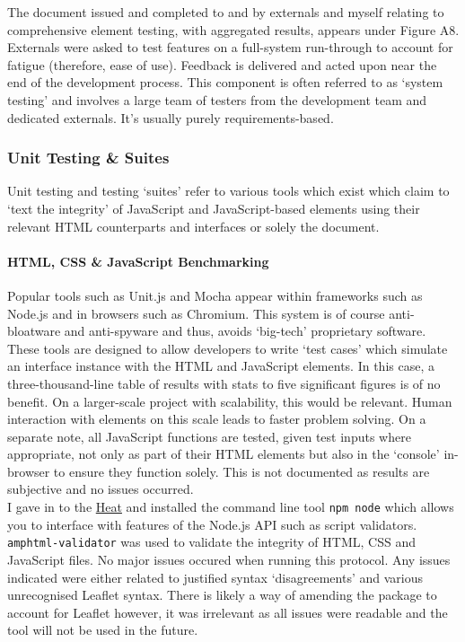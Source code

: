 \documentclass[11pt, english]{article}
\begin{document}
	The document issued and completed to and by externals and myself relating to comprehensive element testing, with aggregated results, appears under Figure A8. Externals were asked to test features on a full-system run-through to account for fatigue (therefore, ease of use). Feedback is delivered and acted upon near the end of the development process. This component is often referred to as `system testing' and involves a large team of testers from the development team and dedicated externals. It's usually purely requirements-based.

		\subsubsection{Unit Testing \& Suites}

	Unit testing and testing `suites' refer to various tools which exist which claim to `text the integrity' of JavaScript and JavaScript-based elements using their relevant HTML counterparts and interfaces or solely the document.

			\paragraph{HTML, CSS \& JavaScript Benchmarking}

 	Popular tools such as Unit.js and Mocha appear within frameworks such as Node.js and in browsers such as Chromium. This system is of course anti-bloatware and anti-spyware and thus, avoids `big-tech' proprietary software. These tools are designed to allow developers to write `test cases' which simulate an interface instance with the HTML and JavaScript elements. In this case, a three-thousand-line table of results with stats to five significant figures is of no benefit. On a larger-scale project with scalability, this would be relevant. Human interaction with elements on this scale leads to faster problem solving. On a separate note, all JavaScript functions are tested, given test inputs where appropriate, not only as part of their HTML elements but also in the `console' in-browser to ensure they function solely. This is not documented as results are subjective and no issues occurred.\\

	I gave in to the \href{https://www.youtube.com/watch?v=ZL9fnVtz_lc}{Heat} and installed the command line tool \texttt{npm node} which allows you to interface with features of the Node.js API such as script validators. \texttt{amphtml-validator} was used to validate the integrity of HTML, CSS and JavaScript files. No major issues occured when running this protocol. Any issues indicated were either related to justified syntax `disagreements' and various unrecognised Leaflet syntax. There is likely a way of amending the package to account for Leaflet however, it was irrelevant as all issues were readable and the tool will not be used in the future.
\end{document}
